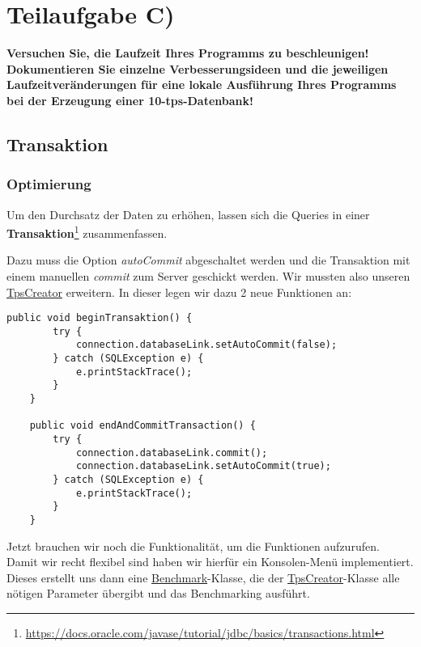 \section{Teilaufgabe C)}
\textbf{Versuchen Sie, die Laufzeit Ihres Programms zu beschleunigen! Dokumentieren Sie
einzelne Verbesserungsideen und die jeweiligen Laufzeitveränderungen für eine lokale
Ausführung Ihres Programms bei der Erzeugung einer 10-tps-Datenbank!}

\subsection{Transaktion}
\subsubsection*{Optimierung}
Um den Durchsatz der Daten zu erhöhen, lassen sich die Queries in einer
\textbf{Transaktion}\footnote{\url{https://docs.oracle.com/javase/tutorial/jdbc/basics/transactions.html}} zusammenfassen.  

Dazu muss die Option \textit{autoCommit} abgeschaltet werden und die Transaktion
mit einem manuellen \textit{commit} zum Server geschickt werden. Wir mussten
also unseren \hyperref[lst:tpsv2]{TpsCreator} erweitern. In
dieser legen wir dazu 2 neue Funktionen an:

\begin{lstlisting}[caption={Erweiterung der TpsCreator-Klasse}]
	public void beginTransaktion() {
		try {
			connection.databaseLink.setAutoCommit(false);
		} catch (SQLException e) {
			e.printStackTrace();
		}
	}
	
	public void endAndCommitTransaction() {
		try {
			connection.databaseLink.commit();
			connection.databaseLink.setAutoCommit(true);
		} catch (SQLException e) {
			e.printStackTrace();
		}
	}
\end{lstlisting}

Jetzt brauchen wir noch die Funktionalität, um die Funktionen aufzurufen. Damit
wir recht flexibel sind haben wir hierfür ein Konsolen-Menü implementiert.
Dieses erstellt uns dann eine  \hyperref[lst:bmv2]{Benchmark}-Klasse, die der
\hyperref[lst:tpsv2]{TpsCreator}-Klasse alle nötigen Parameter übergibt und das Benchmarking ausführt.


